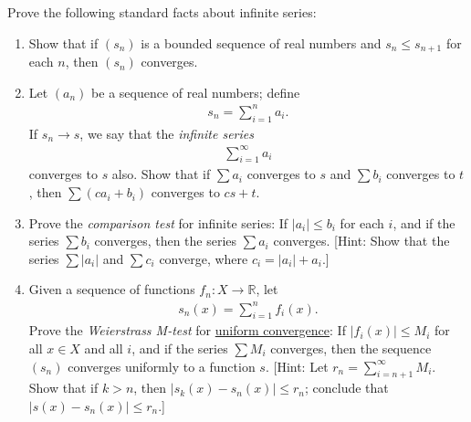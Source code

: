   \begin{exercise}[Munkres 21.11]
    Prove the following standard facts about infinite series:
    \begin{enumerate} 
      \item[(a)] Show that if $(s_n)$ is a bounded sequence of real numbers and $s_n \leq s_{n+1}$ for each $n$, then $(s_n)$ converges.
      \item[(b)] Let $(a_n)$ be a sequence of real numbers; define
      \begin{align*}
        s_n = \sum_{i=1}^{n} a_i.
      \end{align*}
      If $s_n \to s$, we say that the \textit{infinite series}
      \begin{align*}
        \sum_{i=1}^{\infty} a_i
      \end{align*}
      converges to $s$ also. Show that if $\sum a_i$ converges to $s$ and $\sum b_i$ converges to $t$, then $\sum(ca_i + b_i)$ converges to $cs + t$.
      \item[(c)] Prove the \textit{comparison test} for infinite series: If $|a_i| \leq b_i$ for each $i$, and if the series $\sum b_i$ converges, then the series $\sum a_i$ converges. [Hint: Show that the series $\sum|a_i|$ and $\sum c_i$ converge, where $c_i = |a_i| + a_i$.]
      \item[(d)] Given a sequence of functions $f_n : X \to \mathbb{R}$, let
      \begin{align*}
        s_n(x) = \sum_{i=1}^{n} f_i(x).
      \end{align*}
      Prove the \textit{Weierstrass M-test} for \hyperref[def:uniform-convergence]{uniform convergence}: If $|f_i(x)| \leq M_i$ for all $x \in X$ and all $i$, and if the series $\sum M_i$ converges, then the sequence $(s_n)$ converges uniformly to a function $s$. [Hint: Let $r_n = \sum_{i=n+1}^{\infty} M_i$. Show that if $k > n$, then $|s_k(x) - s_n(x)| \leq r_n$; conclude that $|s(x) - s_n(x)| \leq r_n$.]
    \end{enumerate}
  \end{exercise}

